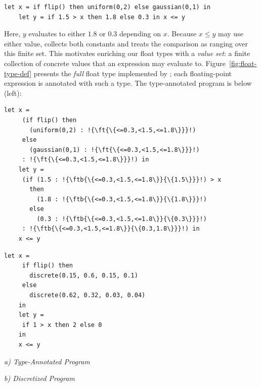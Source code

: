 \begin{lstlisting}[aboveskip=1em,belowskip=1em,escapechar=!,gobble=4]
    let x = if flip() then uniform(0,2) else gaussian(0,1) in
    let y = if 1.5 > x then 1.8 else 0.3 in x <= y
\end{lstlisting}

\noindent Here, $y$ evaluates to either $1.8$ or $0.3$ depending on $x$. Because $x \leq y$ may use either value, \Slice{} collects both constants and treats the comparison as ranging over this finite set. This motivates enriching our float types with a \emph{value set}: a finite collection of concrete values that an expression may evaluate to. Figure~\ref{fig:float-type-def} presents the \emph{full} float type implemented by \Slice{}; each floating-point expression is annotated with such a type. The type-annotated program is below (left):

\begin{center}
    \begin{minipage}[c]{0.58\linewidth}
    \centering
    \begin{lstlisting}[aboveskip=0.6em,belowskip=0.6em,escapechar=!,gobble=4]
    let x =
     (if flip() then
       (uniform(0,2) : !{\ft{\{<=0.3,<1.5,<=1.8\}}}!)
     else
       (gaussian(0,1) : !{\ft{\{<=0.3,<1.5,<=1.8\}}}!)
     : !{\ft{\{<=0.3,<1.5,<=1.8\}}}!) in
    let y =
     (if (1.5 : !{\ftb{\{<=0.3,<1.5,<=1.8\}}{\{1.5\}}}!) > x
       then
         (1.8 : !{\ftb{\{<=0.3,<1.5,<=1.8\}}{\{1.8\}}}!)
       else
         (0.3 : !{\ftb{\{<=0.3,<1.5,<=1.8\}}{\{0.3\}}}!)
     : !{\ftb{\{<=0.3,<1.5,<=1.8\}}{\{0.3,1.8\}}}!) in
    x <= y
    \end{lstlisting}
    \end{minipage}
    \hfill
    \begin{minipage}[c]{0.4\linewidth}
    \centering
    \begin{minipage}{0.92\linewidth}
    \begin{lstlisting}[aboveskip=0.6em,belowskip=0.6em,gobble=4]
    let x =
     if flip() then
       discrete(0.15, 0.6, 0.15, 0.1)
     else
       discrete(0.62, 0.32, 0.03, 0.04)
    in
    let y =
     if 1 > x then 2 else 0
    in
    x <= y
    \end{lstlisting}
    \end{minipage}
    \end{minipage}

    \smallskip
    \begin{minipage}{0.42\linewidth}
    \centering
    \textit{a) Type-Annotated Program}
    \end{minipage}
    \hfill
    \begin{minipage}{0.4\linewidth}
    \centering
    \textit{b) Discretized Program}
    \end{minipage}
    \label{fig:examples:4}
\end{center}
\vspace{0.6em}

